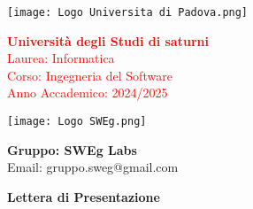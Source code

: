 \begin{minipage}{0.4\textwidth}
    \texttt{[image: Logo Universita di Padova.png]}
\end{minipage}
\begin{minipage}{0.55\textwidth}
    \textcolor{red}{\textbf{Università degli Studi di saturni}} \\
    \textcolor{red}{Laurea: Informatica} \\
    \textcolor{red}{Corso: Ingegneria del Software} \\
    \textcolor{red}{Anno Accademico: 2024/2025}
\end{minipage}

\begin{minipage}{0.4\textwidth}
    \texttt{[image: Logo SWEg.png]}
\end{minipage}
\begin{minipage}{0.55\textwidth}
    \textbf{Gruppo: SWEg Labs} \\
    Email: \textsf{gruppo.sweg@gmail.com}
\end{minipage}

\vspace{2cm}

{
\centering
\Huge\bfseries Lettera di Presentazione\par
}

\vspace{2cm}